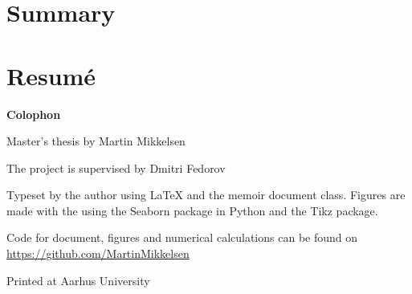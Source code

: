 \section*{Summary}
\thispagestyle{empty}
\lipsum[0-1]
\vspace{1cm}
\section*{Resumé}
\lipsum[0-1]
\newpage



\makeatletter
\edef\fontandleading{\@memptsize.0/\the\baselineskip}
\makeatother
\thispagestyle{empty}
\strut\vfill
{
	\setlength{\parindent}{0pt}
	\addtolength{\parskip}{.6em}
	
	\begin{center}
		\bfseries\sffamily Colophon
	\end{center}
	
	\small
	
	\textsl{\projecttitle}
	
	\smallskip
	
	Master's thesis by Martin Mikkelsen
	
	The project is supervised by Dmitri Fedorov
	
	Typeset by the author using \LaTeX{} and the \textsf{memoir} document class. Figures are made with the using the Seaborn package in Python and the Tikz package.
	
	Code for document, figures and numerical calculations can be found on \url{https://github.com/MartinMikkelsen}
	
	Printed at Aarhus University
}
\newpage